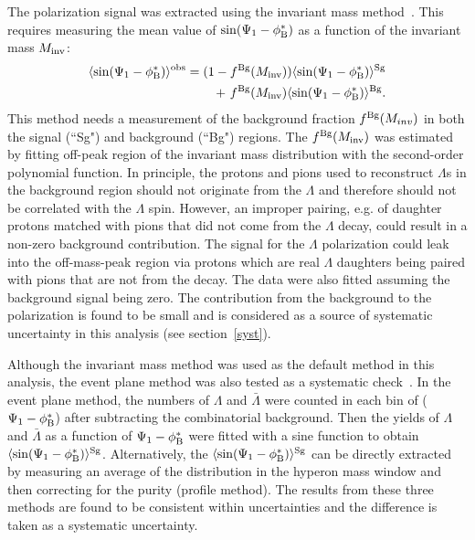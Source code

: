 \documentclass[preprint,5p,times,twocolumn]{elsarticle}
\begin{document}
The polarization signal was extracted using the invariant mass method~\cite{STAR:2018gyt}.  
This requires measuring the mean value of $\sin(\Psi_{1}-\phi_{\rm B}^{\ast})$ as a function of the invariant mass $M_{\rm inv}$:
%
\begin{equation}
\begin{split}
\langle \sin(\Psi_{1}-\phi_{\rm B}^{*}) \rangle^{\rm obs}  =  (1-f^{\rm Bg}(M_{\rm inv})) \langle\sin(\Psi_{1}-\phi_{\rm B}^{\ast})\rangle^{\rm Sg} \\ 
~+~f^{\rm Bg}(M_{\rm inv})\langle\sin(\Psi_{1}-\phi_{\rm B}^{\ast})\rangle^{\rm Bg}.
\end{split}\label{eq:IMmethod}
\end{equation} 
%
This method needs a measurement of the background fraction $f^{\rm Bg}(M_{inv})$ in both the signal (``Sg") and background (``Bg") regions. 
The $f^{\rm Bg}(M_{\rm inv})$ was estimated by fitting off-peak region of the invariant mass distribution with the second-order polynomial function.
In principle, the protons and pions used to reconstruct $\Lambda$s in the background region should not originate from the $\Lambda$ and therefore should not be correlated with the $\Lambda$ spin. 
However, an improper pairing, e.g. of daughter protons matched with pions that did not come from the $\Lambda$ decay, could result in a non-zero background contribution. 
The signal for the $\Lambda$ polarization could leak into the off-mass-peak region via protons which are real $\Lambda$ daughters being paired with pions that are not from the decay.
The data were also fitted assuming the background signal being zero. 
The contribution from the background to the polarization is found to be small and is considered as a source of systematic uncertainty in this analysis (see section~\ref{syst}). 


Although the invariant mass method was used as the default method in this analysis, the event plane method was also tested as a systematic check~\cite{STAR:2013ayu,Borghini:2004ra}. 
In the event plane method, the numbers of $\Lambda$ and $\bar{\Lambda}$ were counted in each bin of ($\Psi_{1}-\phi_{\rm B}^{\ast}$) after subtracting the combinatorial background. 
Then the yields of $\Lambda$ and $\bar{\Lambda}$ as a function of $\Psi_{1}-\phi_{\rm B}^{\ast}$ were fitted with a sine function to obtain $\langle\sin(\Psi_{1}-\phi_{\rm B}^{\ast})\rangle^{\rm Sg}$. 
Alternatively, the $\langle\sin(\Psi_{1}-\phi_{\rm B}^{\ast})\rangle^{\rm Sg}$ can be directly extracted by measuring an average of the distribution in the hyperon mass window and then correcting for the purity (profile method). 
The results from these three methods are found to be consistent within uncertainties and the difference is taken as a systematic uncertainty.
\end{document}
